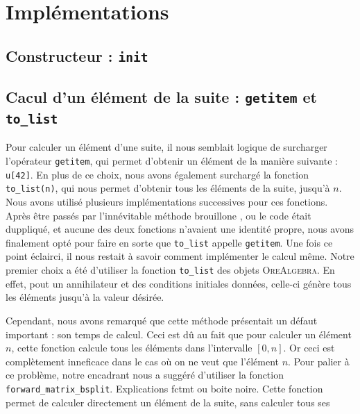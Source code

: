 \documentclass[12pt]{article}
\newlength{\charwidth}
\newcommand{\uline}{\underline{\hspace{2\charwidth}}}
\begin{document}

\section{Implémentations}
    \subsection{Constructeur : \texttt{\uline init\uline}}
    \subsection{Cacul d'un élément de la suite : \texttt{\uline getitem\uline } et \texttt{to\_list}}
        Pour calculer un élément d'une suite, il nous semblait logique de surcharger l'opérateur
        \texttt{\uline getitem\uline }, qui permet d'obtenir un élément de la manière suivante : 
        \texttt{u[42]}. En plus de ce choix, nous avons également surchargé la fonction
        \texttt{to\_list(n)}, qui nous permet d'obtenir tous les éléments de la suite, jusqu'à $n$.
        Nous avons utilisé plusieurs implémentations successives pour ces fonctions.
        Après être passés par l'innévitable \og méthode brouillone \fg, ou le code était duppliqué,
        et aucune des deux fonctions n'avaient une identité propre, nous avons finalement opté pour
        faire en sorte que \texttt{to\_list} appelle \texttt{\uline getitem\uline }. Une fois ce point
        éclairci, il nous restait à savoir comment implémenter le calcul même. Notre premier choix
        a été d'utiliser la fonction \texttt{to\_list} des objets \textsc{OreAlgebra}. En effet,
        pout un annihilateur et des conditions initiales données, celle-ci génère tous les éléments
        jusqu'à la valeur désirée.
        \par Cependant, nous avons remarqué que cette méthode présentait un défaut important : son
        temps de calcul. Ceci est dû au fait que pour calculer un élément $n$, cette fonction
        calcule tous les éléments dans l'intervalle $[0,n]$. Or ceci est complètement inneficace
        dans le cas où on ne veut que l'élément $n$. Pour palier à ce problème, notre encadrant nous 
        a suggéré d'utiliser la fonction \texttt{forward\_matrix\_bsplit}.
        {\color{red} Explications fctmt ou boite noire.}
        Cette fonction permet de calculer directement un élément de la suite, sans calculer tous ses
\end{document}
